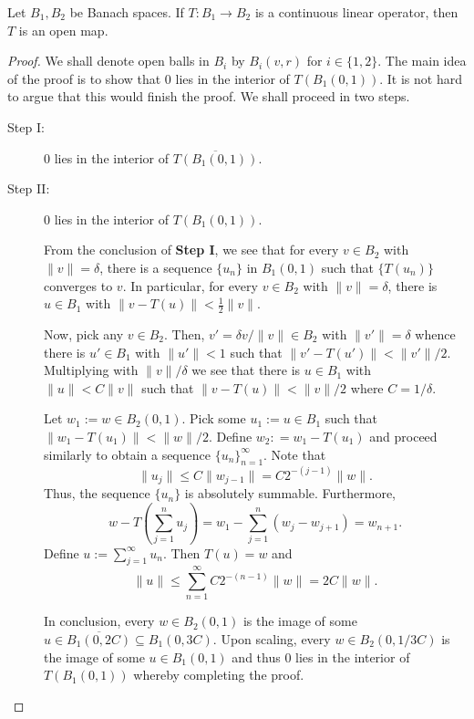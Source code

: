 \begin{theorem}
    Let $B_1, B_2$ be Banach spaces. If $T: B_1\to B_2$ is a continuous linear operator, then $T$ is an open map.
\end{theorem}
\begin{proof}
We shall denote open balls in $B_i$ by $B_i(v, r)$ for $i\in\{1,2\}$. The main idea of the proof is to show that $0$ lies in the interior of $T(B_1(0,1))$. It is not hard to argue that this would finish the proof. We shall proceed in two steps.
\begin{description}
    \item[Step I:] $0$ lies in the interior of $\overline{T(B_1(0,1))}$.

    \item[Step II:] $0$ lies in the interior of $T(B_1(0,1))$.

    From the conclusion of \textbf{Step I}, we see that for every $v\in B_2$ with $\|v\| = \delta$, there is a sequence $\{u_n\}$ in $B_1(0,1)$ such that $\{T(u_n)\}$ converges to $v$. In particular, for every $v\in B_2$ with $\|v\| = \delta$, there is $u\in B_1$ with $\|v - T(u)\| < \frac{1}{2}\|v\|$. 

    Now, pick any $v\in B_2$. Then, $v' = \delta v/\|v\|\in B_2$ with $\|v'\| = \delta$ whence there is $u'\in B_1$ with $\|u'\| < 1$ such that $\|v' - T(u')\| < \|v'\|/2$. Multiplying with $\|v\|/\delta$ we see that there is $u\in B_1$ with $\|u\| < C\|v\|$ such that $\|v - T(u)\| < \|v\|/2$ where $C = 1/\delta$.

    Let $w_1 := w\in B_2(0,1)$. Pick some $u_1 := u\in B_1$ such that $\|w_1 - T(u_1)\| < \|w\|/2$. Define $w_2 : = w_1 - T(u_1)$ and proceed similarly to obtain a sequence $\{u_n\}_{n = 1}^\infty$. Note that 
    \begin{equation*}
        \|u_j\|\le C\|w_{j - 1}\| = C2^{-(j - 1)}\|w\|.
    \end{equation*}
    Thus, the sequence $\{u_n\}$ is absolutely summable. Furthermore, 
    \begin{equation*}
        w - T\left(\sum_{j = 1}^n u_j\right) = w_1 - \sum_{j = 1}^n (w_j - w_{j + 1}) = w_{n + 1}.
    \end{equation*}
    Define $u := \sum_{j = 1}^\infty u_n$. Then $T(u) = w$ and 
    \begin{equation*}
        \|u\|\le\sum_{n = 1}^\infty C2^{-(n - 1)}\|w\| = 2C\|w\|.
    \end{equation*}

    In conclusion, every $w\in B_2(0,1)$ is the image of some $u\in \overline{B_1(0,2C)}\subseteq B_1(0, 3C)$. Upon scaling, every $w\in B_2(0, 1/3C)$ is the image of some $u\in B_1(0,1)$ and thus $0$ lies in the interior of $T(B_1(0,1))$ whereby completing the proof.\qedhere
\end{description}
\end{proof}

